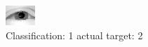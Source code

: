 \begin{figure}[h!]
\begin{center}
\includegraphics[width=0.60\columnwidth]{figures/ID2315_class_1_target_2.png}
\end{center}
\caption{ Classification: 1 actual target: 2}
\label{fig:ID2315_class_1_target_2}
\end{figure}
